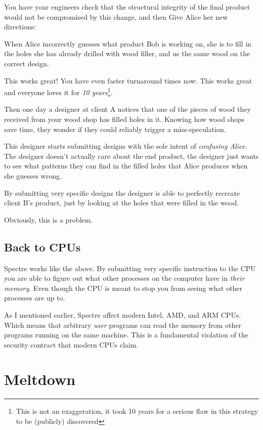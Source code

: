 \documentclass{article}
\begin{document}
You have your engineers check that the structural integrity of the final product
would not be compromised by this change, and then Give Alice her new directions:

When Alice incorrectly guesses what product Bob is working on, she is to fill
in the holes she has already drilled with wood filler, and us the same wood on
the correct design.

This works great! You have even faster turnaround times now. This works great
and everyone loves it for \emph{10 years}\footnote{This is not an exaggeration,
it took 10 years for a serious flaw in this strategy to be (publicly) discovered}.

Then one day a designer at client A notices that one of the pieces of wood they
received from your wood shop has filled holes in it. Knowing how wood shops
save time, they wonder if they could reliably trigger a miss-speculation.

This designer starts submitting designs with the sole intent of \emph{confusing
Alice}. The designer doesn't actually care about the end product, the designer
just wants to see what patterns they can find in the filled holes that Alice
produces when she guesses wrong.

By submitting very specific designs the designer is able to perfectly recreate
client B's product, just by looking at the holes that were filled in the wood.

Obviously, this is a problem.


\subsection*{Back to CPUs}


Spectre works like the above. By submitting very specific instruction to the
CPU you are able to figure out what other processes on the computer have in
\emph{their memory}. Even though the CPU is meant to stop you from seeing what
other processes are up to.

As I mentioned earlier, Spectre affect modern Intel, AMD, and ARM CPUs. Which
means that arbitrary \emph{user} programs can read the memory from other
programs running on the same machine. This is a fundamental violation of the
security contract that modern CPUs claim.

\section{Meltdown}
\end{document}
